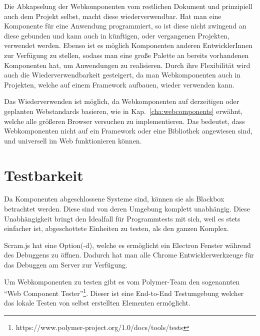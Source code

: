 Die Abkapselung der Webkomponenten vom restlichen Dokument und prinzipiell auch dem Projekt selbst, macht diese wiederverwendbar. Hat man eine Komponente für eine Anwendung programmiert, so ist diese nicht zwingend an diese gebunden und kann auch in künftigen, oder vergangenen Projekten, verwendet werden. Ebenso ist es möglich Komponenten anderen EntwicklerInnen zur Verfügung zu stellen, sodass man eine große Palette an bereits vorhandenen Komponenten hat, um Anwendungen zu realisieren. Durch ihre Flexibilität wird auch die Wiederverwendbarkeit gesteigert, da man Webkomponenten auch in Projekten, welche auf einem Framework aufbauen, wieder verwenden kann. 

Das Wiederverwenden ist möglich, da Webkomponenten auf derzeitigen oder geplanten Webstandards basieren, wie in Kap.~\ref{cha:webcomponents} erwähnt, welche alle größeren Browser versuchen zu implementieren. Das bedeutet, dass Webkomponenten nicht auf ein Framework oder eine Bibliothek angewiesen sind, und universell im Web funktionieren können.

\section{Testbarkeit}

Da Komponenten abgeschlossene Systeme sind, können sie als Blackbox betrachtet werden. Diese sind von deren Umgebung komplett unabhängig. Diese Unabhängigkeit bringt den Idealfall für Programmtests mit sich, weil es stets einfacher ist, abgeschottete Einheiten zu testen, als den ganzen Komplex.

Scram.js hat eine Option(-d), welche es ermöglicht ein Electron Fenster während des Debuggens zu öffnen. Dadurch hat man alle Chrome Entwicklerwerkzeuge für das Debuggen am Server zur Verfügung.

Um Webkomponenten zu testen gibt es vom Polymer-Team den sogenannten "`Web Component Tester"'\footnote{https://www.polymer-project.org/1.0/docs/tools/tests}. Dieser ist eine End-to-End Testumgebung welcher das lokale Testen von selbst erstellten Elementen ermöglicht.